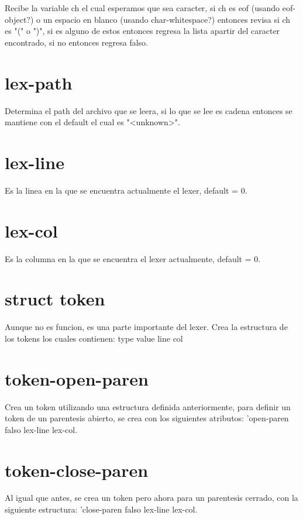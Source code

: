 \documentclass{article}
\begin{document}
Recibe la variable ch el cual esperamos que sea caracter, si ch es eof (usando eof-object?) o un espacio en blanco (usando char-whitespace?) entonces revisa si ch es "(" o ")", si es alguno de estos entonces regresa la lista apartir del caracter encontrado, si no entonces regresa falso.

\section{lex-path}

Determina el path del archivo que se leera, si lo que se lee es cadena entonces se mantiene con el default el cual es "<unknown>".

\section{lex-line}

Es la linea en la que se encuentra actualmente el lexer, default = 0.

\section{lex-col}

Es la columna en la que se encuentra el lexer actualmente, default = 0.

\section{struct token}

Aunque no es funcion, es una parte importante del lexer. Crea la estructura de los tokens los cuales contienen: type value line col

\section{token-open-paren}

Crea un token utilizando una estructura definida anteriormente, para definir un token de un parentesis abierto, se crea con los siguientes atributos: 'open-paren falso lex-line lex-col.

\section{token-close-paren}

Al igual que antes, se crea un token pero ahora para un parentesis cerrado, con la siguiente estructura: 'close-paren falso lex-line lex-col.
\end{document}
